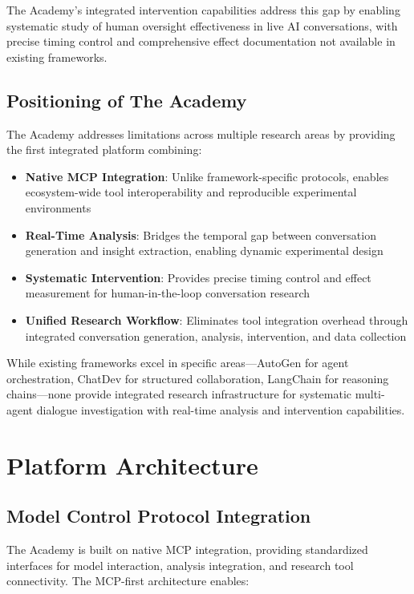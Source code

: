 \documentclass[11pt,letterpaper]{article}
\newcommand{\theacademy}{The Academy}
\newcommand{\mcp}{MCP}
\begin{document}
\theacademy{}'s integrated intervention capabilities address this gap by enabling systematic study of human oversight effectiveness in live AI conversations, with precise timing control and comprehensive effect documentation not available in existing frameworks.

\subsection{Positioning of \theacademy{}}

\theacademy{} addresses limitations across multiple research areas by providing the first integrated platform combining:

\begin{itemize}
    \item \textbf{Native MCP Integration}: Unlike framework-specific protocols, enables ecosystem-wide tool interoperability and reproducible experimental environments
    \item \textbf{Real-Time Analysis}: Bridges the temporal gap between conversation generation and insight extraction, enabling dynamic experimental design
    \item \textbf{Systematic Intervention}: Provides precise timing control and effect measurement for human-in-the-loop conversation research
    \item \textbf{Unified Research Workflow}: Eliminates tool integration overhead through integrated conversation generation, analysis, intervention, and data collection
\end{itemize}

While existing frameworks excel in specific areas—AutoGen for agent orchestration, ChatDev for structured collaboration, LangChain for reasoning chains—none provide integrated research infrastructure for systematic multi-agent dialogue investigation with real-time analysis and intervention capabilities.
\section{Platform Architecture}

\subsection{Model Control Protocol Integration}

\theacademy{} is built on native \mcp{} integration, providing standardized interfaces for model interaction, analysis integration, and research tool connectivity. The \mcp{}-first architecture enables:
\end{document}

